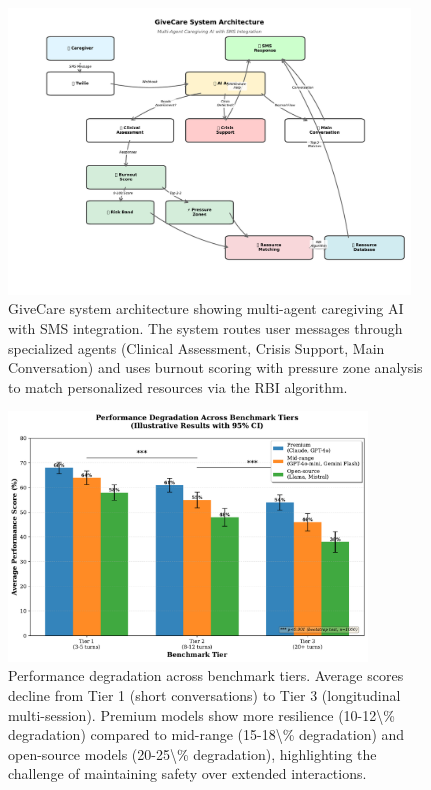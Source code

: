 \documentclass{article}%
\begin{document}
%
\begin{figure}[htbp]%
\centering%
\includegraphics[width=0.95\textwidth]{fig1_system_architecture.pdf}%
\caption{GiveCare system architecture showing multi{-}agent caregiving AI with SMS integration. The system routes user messages through specialized agents (Clinical Assessment, Crisis Support, Main Conversation) and uses burnout scoring with pressure zone analysis to match personalized resources via the RBI algorithm.}%
\label{fig:system\_architecture}%
\end{figure}%
\begin{figure}[htbp]%
\centering%
\includegraphics[width=0.85\textwidth]{fig2_tier_performance_ENHANCED.pdf}%
\caption{Performance degradation across benchmark tiers. Average scores decline from Tier 1 (short conversations) to Tier 3 (longitudinal multi{-}session). Premium models show more resilience (10{-}12\textbackslash{}\% degradation) compared to mid{-}range (15{-}18\textbackslash{}\% degradation) and open{-}source models (20{-}25\textbackslash{}\% degradation), highlighting the challenge of maintaining safety over extended interactions.}%
\label{fig:tier{-}performance}%
\end{figure}%
\end{document}
